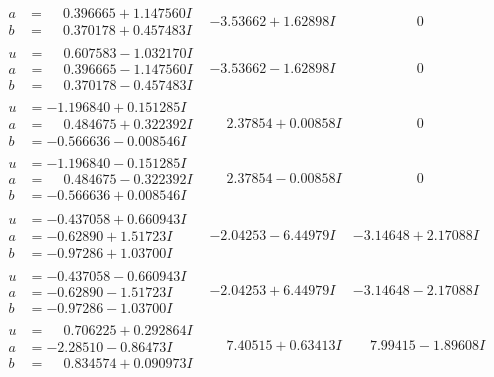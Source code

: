\documentclass[1p]{elsarticle_modified}
\theoremstyle{definition}
\begin{document}
$$\begin{array}{c|c|c}
\begin{aligned}
a &= \phantom{-}0.396665 + 1.147560 I \\
b &= \phantom{-}0.370178 + 0.457483 I\end{aligned}
 & -3.53662 + 1.62898 I & \phantom{-0.000000 } 0 \\ \hline\begin{aligned}
u &= \phantom{-}0.607583 - 1.032170 I \\
a &= \phantom{-}0.396665 - 1.147560 I \\
b &= \phantom{-}0.370178 - 0.457483 I\end{aligned}
 & -3.53662 - 1.62898 I & \phantom{-0.000000 } 0 \\ \hline\begin{aligned}
u &= -1.196840 + 0.151285 I \\
a &= \phantom{-}0.484675 + 0.322392 I \\
b &= -0.566636 - 0.008546 I\end{aligned}
 & \phantom{-}2.37854 + 0.00858 I & \phantom{-0.000000 } 0 \\ \hline\begin{aligned}
u &= -1.196840 - 0.151285 I \\
a &= \phantom{-}0.484675 - 0.322392 I \\
b &= -0.566636 + 0.008546 I\end{aligned}
 & \phantom{-}2.37854 - 0.00858 I & \phantom{-0.000000 } 0 \\ \hline\begin{aligned}
u &= -0.437058 + 0.660943 I \\
a &= -0.62890 + 1.51723 I \\
b &= -0.97286 + 1.03700 I\end{aligned}
 & -2.04253 - 6.44979 I & -3.14648 + 2.17088 I \\ \hline\begin{aligned}
u &= -0.437058 - 0.660943 I \\
a &= -0.62890 - 1.51723 I \\
b &= -0.97286 - 1.03700 I\end{aligned}
 & -2.04253 + 6.44979 I & -3.14648 - 2.17088 I \\ \hline\begin{aligned}
u &= \phantom{-}0.706225 + 0.292864 I \\
a &= -2.28510 - 0.86473 I \\
b &= \phantom{-}0.834574 + 0.090973 I\end{aligned}
 & \phantom{-}7.40515 + 0.63413 I & \phantom{-}7.99415 - 1.89608 I \\ \hline\begin{aligned}

\end{aligned}
\end{array}$$
\end{document}
